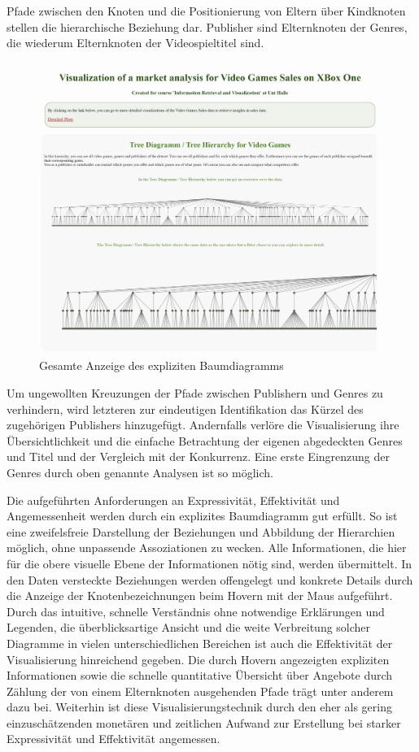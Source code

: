 \documentclass[usegeometry=true]{scrartcl}
\begin{document}
Pfade zwischen den Knoten und die Positionierung von Eltern über Kindknoten stellen die hierarchische Beziehung dar. 
Publisher sind Elternknoten der Genres, die wiederum Elternknoten der Videospieltitel sind.
\begin{figure}[h]
        \centering
        \includegraphics[height=9.5cm]{Bilder/TreeHierarchy_full.png}
        \caption{Gesamte Anzeige des expliziten Baumdiagramms}
        \label{fig:TreeHierarchy}
\end{figure}
Um ungewollten Kreuzungen der Pfade zwischen Publishern und Genres zu verhindern, wird letzteren zur eindeutigen Identifikation das Kürzel des zugehörigen Publishers hinzugefügt.
Andernfalls verlöre die Visualisierung ihre Übersichtlichkeit und die einfache Betrachtung der eigenen abgedeckten Genres und Titel und der Vergleich mit der Konkurrenz.
Eine erste Eingrenzung der Genres durch oben genannte Analysen ist so möglich.

Die aufgeführten Anforderungen an Expressivität, Effektivität und Angemessenheit werden durch ein explizites Baumdiagramm gut erfüllt.
So ist eine zweifelsfreie Darstellung der Beziehungen und Abbildung der Hierarchien möglich, ohne unpassende Assoziationen zu wecken. 
Alle Informationen, die hier für die obere visuelle Ebene der Informationen nötig sind, werden übermittelt. 
In den Daten versteckte Beziehungen werden offengelegt und konkrete Details durch die Anzeige der Knotenbezeichnungen beim Hovern mit der Maus aufgeführt.
Durch das intuitive, schnelle Verständnis ohne notwendige Erklärungen und Legenden, die überblicksartige Ansicht und die weite Verbreitung solcher Diagramme in vielen unterschiedlichen Bereichen ist auch die Effektivität der Visualisierung hinreichend gegeben. 
Die durch Hovern angezeigten expliziten Informationen sowie die schnelle quantitative Übersicht über Angebote durch Zählung der von einem Elternknoten ausgehenden Pfade trägt unter anderem dazu bei.
Weiterhin ist diese Visualisierungstechnik durch den eher als gering einzuschätzenden monetären und zeitlichen Aufwand zur Erstellung bei starker Expressivität und Effektivität angemessen.
\end{document}
